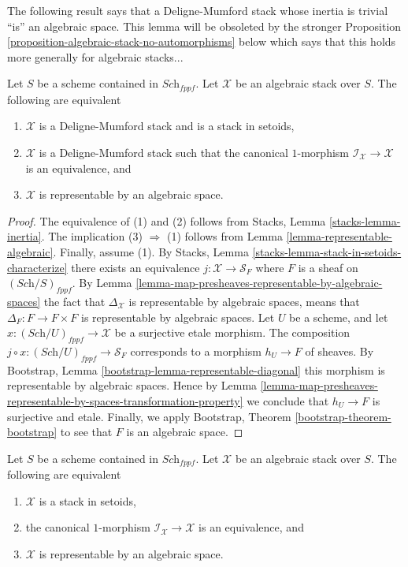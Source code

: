\noindent
The following result says that a Deligne-Mumford stack whose inertia
is trivial ``is'' an algebraic space. This lemma will be obsoleted by
the stronger
Proposition \ref{proposition-algebraic-stack-no-automorphisms}
below which says that this holds more generally for algebraic stacks...

\begin{lemma}
\label{lemma-algebraic-stack-no-automorphisms}
Let $S$ be a scheme contained in $\textit{Sch}_{fppf}$.
Let $\mathcal{X}$ be an algebraic stack over $S$.
The following are equivalent
\begin{enumerate}
\item $\mathcal{X}$ is a Deligne-Mumford stack and is a stack in setoids,
\item $\mathcal{X}$ is a Deligne-Mumford stack such that the
canonical $1$-morphism $\mathcal{I}_\mathcal{X} \to \mathcal{X}$
is an equivalence, and
\item $\mathcal{X}$ is representable by an algebraic space.
\end{enumerate}
\end{lemma}

\begin{proof}
The equivalence of (1) and (2) follows from
Stacks, Lemma \ref{stacks-lemma-inertia}.
The implication (3) $\Rightarrow$ (1) follows from
Lemma \ref{lemma-representable-algebraic}.
Finally, assume (1). By
Stacks, Lemma \ref{stacks-lemma-stack-in-setoids-characterize}
there exists an equivalence $j : \mathcal{X} \to \mathcal{S}_F$
where $F$ is a sheaf on $(\textit{Sch}/S)_{fppf}$. By
Lemma \ref{lemma-map-presheaves-representable-by-algebraic-spaces}
the fact that $\Delta_\mathcal{X}$ is representable by algebraic
spaces, means that $\Delta_F : F \to F \times F$
is representable by algebraic spaces.
Let $U$ be a scheme, and let $x : (\textit{Sch}/U)_{fppf} \to \mathcal{X}$
be a surjective etale morphism. The composition
$j \circ x : (\textit{Sch}/U)_{fppf} \to \mathcal{S}_F$
corresponds to a morphism $h_U \to F$ of sheaves. By
Bootstrap, Lemma \ref{bootstrap-lemma-representable-diagonal}
this morphism is representable by algebraic spaces.
Hence by
Lemma
\ref{lemma-map-presheaves-representable-by-spaces-transformation-property}
we conclude that $h_U \to F$ is surjective and etale.
Finally, we apply
Bootstrap, Theorem \ref{bootstrap-theorem-bootstrap}
to see that $F$ is an algebraic space.
\end{proof}

\begin{proposition}
\label{proposition-algebraic-stack-no-automorphisms}
Let $S$ be a scheme contained in $\textit{Sch}_{fppf}$.
Let $\mathcal{X}$ be an algebraic stack over $S$.
The following are equivalent
\begin{enumerate}
\item $\mathcal{X}$ is a stack in setoids,
\item the canonical $1$-morphism $\mathcal{I}_\mathcal{X} \to \mathcal{X}$
is an equivalence, and
\item $\mathcal{X}$ is representable by an algebraic space.
\end{enumerate}
\end{proposition}

